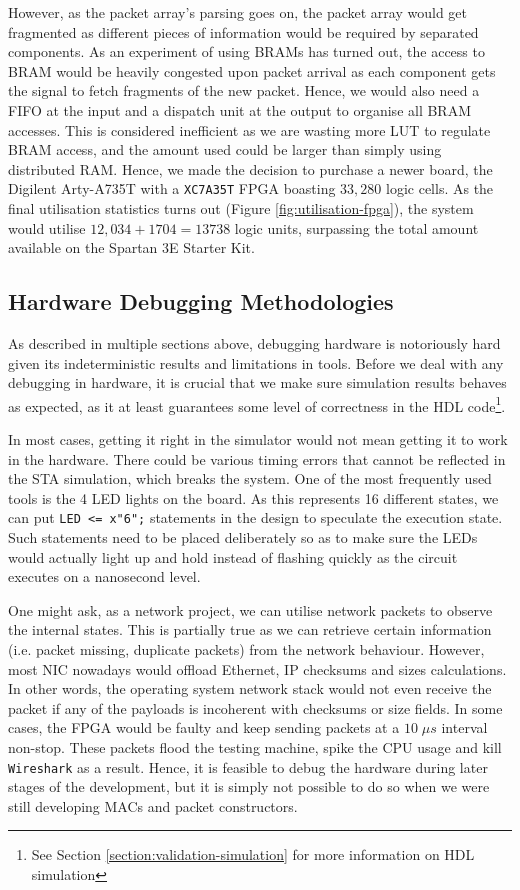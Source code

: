\documentclass[a4paper]{report}
\newcommand{\code}{\texttt}
\begin{document}
However, as the packet array's parsing goes on, the packet array would get fragmented as different pieces of information would be required by separated components. As an experiment of using BRAMs has turned out, the access to BRAM would be heavily congested upon packet arrival as each component gets the signal to fetch fragments of the new packet. Hence, we would also need a FIFO at the input and a dispatch unit at the output to organise all BRAM accesses. This is considered inefficient as we are wasting more LUT to regulate BRAM access, and the amount used could be larger than simply using distributed RAM. Hence, we made the decision to purchase a newer board, the Digilent Arty-A735T with a \code{XC7A35T} FPGA boasting $33,280$ logic cells\cite{xilinx-documentation-artix}. As the final utilisation statistics turns out (Figure \ref{fig:utilisation-fpga}), the system would utilise $12,034 + 1704 = 13738$ logic units, surpassing the total amount available on the Spartan 3E Starter Kit.

\subsection{Hardware Debugging Methodologies}

As described in multiple sections above, debugging hardware is notoriously hard given its indeterministic results and limitations in tools. Before we deal with any debugging in hardware, it is crucial that we make sure simulation results behaves as expected, as it at least guarantees some level of correctness in the HDL code\footnote{See Section \ref{section:validation-simulation} for more information on HDL simulation}. 

In most cases, getting it right in the simulator would not mean getting it to work in the hardware. There could be various timing errors that cannot be reflected in the STA simulation, which breaks the system. One of the most frequently used tools is the 4 LED lights on the board. As this represents 16 different states, we can put \code{LED <\null= x"6";} statements in the design to speculate the execution state. Such statements need to be placed deliberately so as to make sure the LEDs would actually light up and hold instead of flashing quickly as the circuit executes on a nanosecond level.

One might ask, as a network project, we can utilise network packets to observe the internal states. This is partially true as we can retrieve certain information (i.e. packet missing, duplicate packets) from the network behaviour. However, most NIC nowadays would offload Ethernet, IP checksums and sizes calculations. In other words, the operating system network stack would not even receive the packet if any of the payloads is incoherent with checksums or size fields. In some cases, the FPGA would be faulty and keep sending packets at a $10\; \mu s$ interval non-stop. These packets flood the testing machine, spike the CPU usage and kill \code{Wireshark} as a result. Hence, it is feasible to debug the hardware during later stages of the development, but it is simply not possible to do so when we were still developing MACs and packet constructors.
\end{document}
